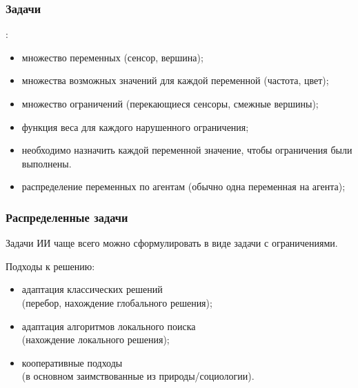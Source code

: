 \documentclass{beamer}
\begin{document}
\begin{frame}
  \frametitle{Задачи }
   :
  \begin{itemize}
    \item<1-> множество переменных (сенсор, вершина);
    \item<2-> множества возможных значений для каждой переменной (частота, цвет);
    \item<3-> множество ограничений (перекающиеся сенсоры, смежные вершины);
    \item<5-| alert@6> функция веса для каждого нарушенного ограничения;
    \item<4-> необходимо 
      {назначить каждой переменной значение, чтобы ограничения были выполнены}.
    \item<6-> распределение переменных по агентам (обычно одна переменная на агента);
  \end{itemize}
\end{frame}

\begin{frame}
  \frametitle{Распределенные задачи}
  Задачи ИИ чаще всего можно сформулировать в виде задачи с ограничениями.

  Подходы к решению:
  \begin{itemize}
    \item адаптация классических решений \\ (перебор, нахождение глобального решения);
    \item адаптация алгоритмов локального поиска \\ (нахождение локального решения);
    \item кооперативные подходы \\ (в основном заимствованные из природы/социологии).
  \end{itemize}
\end{frame}

\end{document}
